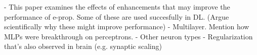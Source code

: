 \begin{tcolorbox}[colback=orange]

- This paper examines the effects of enhancements that may improve the performance of e-prop. Some of these are used succesfully in DL. (Argue scientifically why these might improve performance)
    - Multilayer. Mention how MLPs were breakthrough on perceptrons.
    - Other neuron types
    - Regularization that's also observed in brain (e.g. synaptic scaling)

\vspace{8cm}

\end{tcolorbox}
